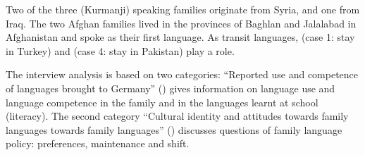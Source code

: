\documentclass[output=paper,colorlinks,citecolor=brown]{langscibook}
\begin{document}
\begin{table}%
    \caption{Overview of the case studies}
    \label{ch2.5.tab.1}
\end{table}

Two of the three  (Kurmanji) speaking families originate from Syria, and one from Iraq. The two Afghan families lived in the provinces of Baghlan and Jalalabad in Afghanistan and spoke  as their first language.  As transit languages,  (case 1: stay in Turkey) and  (case 4: stay in Pakistan) play a role. 

The interview analysis is based on two categories: ``Reported use and competence of languages brought to Germany'' () gives information on language use and language competence in the family and in the languages learnt at school (literacy). The second category ``Cultural identity and attitudes towards family languages towards family languages'' () discusses questions of family language policy: preferences, maintenance and shift.
\end{document}
